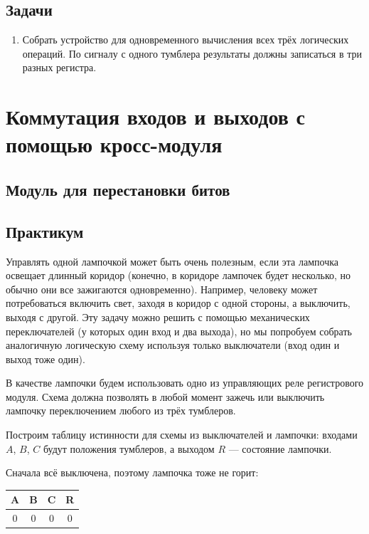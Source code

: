 \section{Задачи}

\begin{enumerate}
    \item Собрать устройство для одновременного вычисления всех трёх логических операций. По сигналу с одного тумблера
          результаты должны записаться в три разных регистра.
\end{enumerate}


\chapter{Коммутация входов и выходов с помощью кросс-модуля}

\section{Модуль для перестановки битов}

\section{Практикум}

Управлять одной лампочкой может быть очень полезным, если эта лампочка освещает
длинный коридор (конечно, в коридоре лампочек будет несколько, но обычно
они все зажигаются одновременно). Например, человеку может потребоваться включить
свет, заходя в коридор с одной стороны, а выключить, выходя с другой.
Эту задачу можно решить с помощью механических переключателей (у которых один вход и два выхода),
но мы попробуем собрать аналогичную логическую схему используя только выключатели
(вход один и выход тоже один).

В качестве лампочки будем использовать одно из управляющих реле регистрового модуля.
Схема должна позволять в любой момент зажечь или выключить лампочку переключением любого
из трёх тумблеров.

Построим таблицу истинности для схемы из выключателей и лампочки: входами $A$, $B$, $C$ будут
положения тумблеров, а выходом $R$ --- состояние лампочки.

Сначала всё выключена, поэтому лампочка тоже не горит:

\begin{center}
\begin{tabular}{|c|c|c|c|}
 \hline
 \textbf{A} & \textbf{B} & \textbf{C} & \textbf{R} \\ \hline
 $0$ & $0$ & $0$ & $0$ \\ \hline
\end{tabular}
\end{center}

